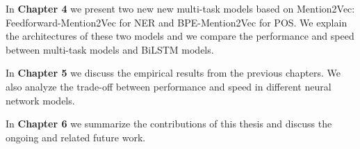 In \textbf{Chapter 4} we present two new new multi-task models based on Mention2Vec: Feedforward-Mention2Vec for NER and BPE-Mention2Vec for POS. We explain the architectures of these two models and we compare the performance and speed between multi-task models and BiLSTM models.

In \textbf{Chapter 5} we discuss the empirical results from the previous chapters. We also analyze the trade-off between performance and speed in different neural network models.

In \textbf{Chapter 6} we summarize the contributions of this thesis and discuss the ongoing and related future work.